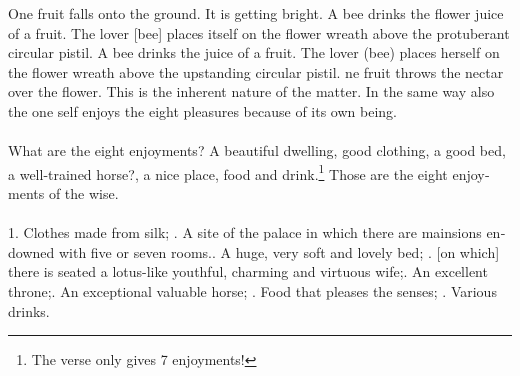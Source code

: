 \begin{otherlanguage}{english}
\begin{tlate}
  One fruit falls onto the ground. It is getting bright. A bee drinks the flower juice of a fruit. The lover [bee] places itself on the flower wreath above the protuberant circular pistil. A bee drinks the juice of a fruit. The lover (bee) places herself on the flower wreath above the upstanding circular pistil. ne fruit throws the nectar over the flower. This is the inherent nature of the matter. In the same way also the one self enjoys the eight pleasures because of its own being.  
\\ \\
What are the eight enjoyments?  \hfill \break
A beautiful dwelling, good clothing, a good bed, a well-trained horse?, a nice place, food and drink.\footnote{The verse only gives 7 enjoyments!} Those are the eight enjoyments of the wise.
\\ \\
  1. Clothes made from silk; \hfill {}. A site of the palace in which there are mainsions endowned with five or seven rooms.\hfill {}. A huge, very soft and lovely bed; \hfill {}. [on which] there is seated a lotus-like youthful, charming and virtuous wife;\hfill {}. An excellent throne;\hfill {}. An exceptional valuable horse; \hfill {}. Food that pleases the senses; \hfill {}. Various drinks. \hfill \break 


\end{tlate}
\end{otherlanguage}
